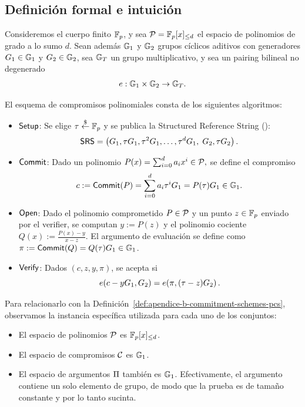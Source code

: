 
\subsection{Definición formal e intuición}
\label{subsec:apendice-b-kzg-definicion-formal-e-intuicion}

\begin{definition}[\KZG \PCS]
\label{def:apendice-b-kzg-kzg-pcs}
	Consideremos el cuerpo finito $\mathbb{F}_p$, y sea $\mathcal{P} = \mathbb{F}_p[x]_{\leq d}$ el espacio de polinomios de grado a lo sumo $d$. Sean además $\mathbb{G}_1$ y $\mathbb{G}_2$ grupos cíclicos aditivos con generadores $G_1 \in \mathbb{G}_1$ y $G_2 \in \mathbb{G}_2$, sea $\mathbb{G}_T$ un grupo multiplicativo, y sea un pairing bilineal no degenerado
	$$
	e : \mathbb{G}_1 \times \mathbb{G}_2 \to \mathbb{G}_T.
	$$
	
	El esquema de compromisos polinomiales \KZG consta de los siguientes algoritmos:
	
	\begin{itemize}
		\item $\mathsf{Setup}$: Se elige $\tau \overset{\$}{\leftarrow}  \mathbb{F}_p$ y se publica la Structured Reference String (\SRS):
		$$\textsf{SRS} = \left(G_1, \tau G_1, \tau^2 G_1, \ldots, \tau^d G_1,\; G_2, \tau G_2 \right).$$
		\item $\mathsf{Commit}$: Dado un polinomio $P(x) = \sum_{i=0}^{d} a_i x^i \in \mathcal{P},$
		se define el compromiso
		$$c := \mathsf{Commit}(P) = \sum_{i=0}^{d} a_i \tau^i G_1 = P(\tau) G_1 \in \mathbb{G}_1.$$
		
		\item $\mathsf{Open}$: Dado el polinomio comprometido $P \in \mathcal{P}$ y un punto $z \in  \mathbb{F}_p$ enviado por el verifier, se computan $y := P(z)$ y el polinomio cociente $Q(x) := \frac{P(x) - y}{x - z}$. El argumento de evaluación se define como
		$\pi := \mathsf{Commit}(Q) = Q(\tau) G_1 \in \mathbb{G}_1$.
		
		\item $\mathsf{Verify}$: Dados $(c, z, y, \pi)$, se acepta si
		$$e\!\left(c - yG_1,G_2\right) = e\!\left(\pi,(\tau - z)G_2\right).$$
	\end{itemize}
\end{definition}

Para relacionarlo con la Definición~\ref{def:apendice-b-commitment-schemes-pcs}, observamos la instancia específica utilizada para cada uno de los conjuntos:
	\begin{itemize}[itemsep=0.1cm]
		\item El espacio de polinomios $\mathcal{P}$ es $ \mathbb{F}_p[x]_{\leq d}$.
		\item El espacio de compromisos $\mathcal{C}$ es $\mathbb{G}_1$.
		\item El espacio de argumentos $\Pi$ también es $\mathbb{G}_1$. Efectivamente, el argumento contiene un solo elemento de grupo, de modo que la prueba es de tamaño constante y por lo tanto sucinta.
	\end{itemize}

